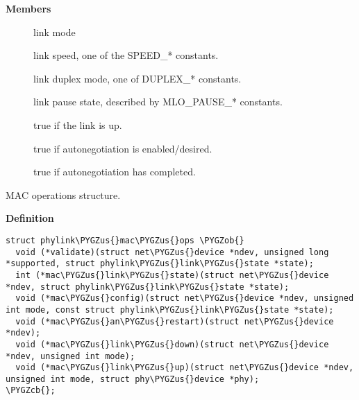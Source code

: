 \documentclass[a4paper,8pt,english]{sphinxmanual}
\def\PYGZus{\char`\_}
\def\PYGZob{\char`\{}
\def\PYGZcb{\char`\}}
\begin{document}
\textbf{Members}
\begin{description}
\item[{}] \leavevmode
link  mode

\item[{}] \leavevmode
link speed, one of the SPEED\_* constants.

\item[{}] \leavevmode
link duplex mode, one of DUPLEX\_* constants.

\item[{}] \leavevmode
link pause state, described by MLO\_PAUSE\_* constants.

\item[{}] \leavevmode
true if the link is up.

\item[{}] \leavevmode
true if autonegotiation is enabled/desired.

\item[{}] \leavevmode
true if autonegotiation has completed.

\end{description}

\begin{fulllineitems}
\label{networking/kapi:c.phylink_mac_ops}
MAC operations structure.

\end{fulllineitems}


\textbf{Definition}

\begin{Verbatim}[commandchars=\\\{\}]
struct phylink\PYGZus{}mac\PYGZus{}ops \PYGZob{}
  void (*validate)(struct net\PYGZus{}device *ndev, unsigned long *supported, struct phylink\PYGZus{}link\PYGZus{}state *state);
  int (*mac\PYGZus{}link\PYGZus{}state)(struct net\PYGZus{}device *ndev, struct phylink\PYGZus{}link\PYGZus{}state *state);
  void (*mac\PYGZus{}config)(struct net\PYGZus{}device *ndev, unsigned int mode, const struct phylink\PYGZus{}link\PYGZus{}state *state);
  void (*mac\PYGZus{}an\PYGZus{}restart)(struct net\PYGZus{}device *ndev);
  void (*mac\PYGZus{}link\PYGZus{}down)(struct net\PYGZus{}device *ndev, unsigned int mode);
  void (*mac\PYGZus{}link\PYGZus{}up)(struct net\PYGZus{}device *ndev, unsigned int mode, struct phy\PYGZus{}device *phy);
\PYGZcb{};
\end{Verbatim}
\end{document}
